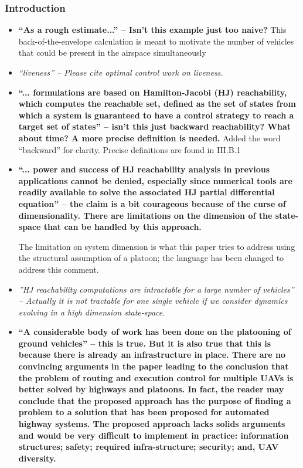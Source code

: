 \documentclass[submit]{aiaa-pretty}
\begin{document}
\subsubsection{Introduction}
\begin{itemize}
\item \textbf{``As a rough estimate...'' – Isn’t this example just too naive?}
This back-of-the-envelope calculation is meant to motivate the number of vehicles that could be present in the airspace simultaneously

\item \textit{“liveness” – Please cite optimal control work on liveness.}

\item \textbf{``... formulations are based on Hamilton-Jacobi (HJ) reachability, which computes the reachable set, defined as the set of states from which a system is guaranteed to have a control strategy to reach a target set of states'' – isn’t this just backward reachability? What about time? A more precise definition is needed.}
Added the word ``backward'' for clarity. Precise definitions are found in III.B.1

\item \textbf{``... power and success of HJ reachability analysis in previous applications cannot be denied, especially since numerical tools are readily available to solve the associated HJ partial differential equation'' – the claim is a bit courageous because of the curse of dimensionality. There are limitations on the dimension of the state-space that can be handled by this approach.}

The limitation on system dimension is what this paper tries to address using the structural assumption of a platoon; the language has been changed to address this comment.

\item \textit{''HJ reachability computations are intractable for a large number of vehicles'' – Actually it is not tractable for one single vehicle if we consider dynamics evolving in a high dimension state-space.}

\item \textbf{``A considerable body of work has been done on the platooning of ground vehicles'' – this is true. But it is also true that this is because there is already an infrastructure in place. There are no convincing arguments in the paper leading to the conclusion that the problem of routing and execution control for multiple UAVs is better solved by highways and platoons. In fact, the reader may conclude that the proposed approach has the purpose of finding a problem to a solution that has been proposed for automated highway systems. The proposed approach lacks solids arguments and would be very difficult to implement in practice: information structures; safety; required infra-structure; security; and, UAV diversity.}


\end{itemize}
\end{document}

